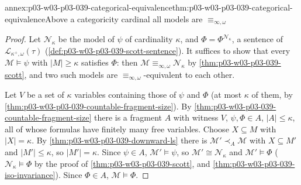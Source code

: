 \begin{annexitem}{annex:p03-w03-p03-039-categorical-equivalence}{thm:p03-w03-p03-039-categorical-equivalence}{Above a categoricity cardinal all models are \(\equiv_{\infty,\omega}\)}
\begin{proof}
Let \(\mathcal N_\kappa\) be the model of \(\psi\) of cardinality \(\kappa\),
and \(\Phi=\Phi^{\mathcal N_\kappa}\), a sentence of
\(\mathcal L_{\kappa^+,\omega}(\tau)\) (\cref{def:p03-w03-p03-039-scott-sentence}).
It suffices to show that every \(\mathcal M\models\psi\) with
\(\lvert M\rvert\ge\kappa\) satisfies \(\Phi\): then
\(\mathcal M\equiv_{\infty,\omega}\mathcal N_\kappa\) by
\cref{thm:p03-w03-p03-039-scott}, and two such models are
\(\equiv_{\infty,\omega}\)-equivalent to each other.

Let \(V\) be a set of \(\kappa\) variables containing those of \(\psi\) and
\(\Phi\) (at most \(\kappa\) of them, by
\cref{thm:p03-w03-p03-039-countable-fragment-size}). By
\cref{thm:p03-w03-p03-039-countable-fragment-size} there is a fragment \(A\)
with witness \(V\), \(\psi,\Phi\in A\), \(\lvert A\rvert\le\kappa\), all of
whose formulas have finitely many free variables. Choose \(X\subseteq M\)
with \(\lvert X\rvert=\kappa\). By \cref{thm:p03-w03-p03-039-downward-ls}
there is \(\mathcal M'\prec_A\mathcal M\) with \(X\subseteq M'\) and
\(\lvert M'\rvert\le\kappa\), so \(\lvert M'\rvert=\kappa\). Since
\(\psi\in A\), \(\mathcal M'\models\psi\), so
\(\mathcal M'\cong\mathcal N_\kappa\) and \(\mathcal M'\models\Phi\)
(\(\mathcal N_\kappa\models\Phi\) by the proof of
\cref{thm:p03-w03-p03-039-scott}, and
\cref{thm:p03-w03-p03-039-iso-invariance}). Since \(\Phi\in A\),
\(\mathcal M\models\Phi\).
\end{proof}
\end{annexitem}

